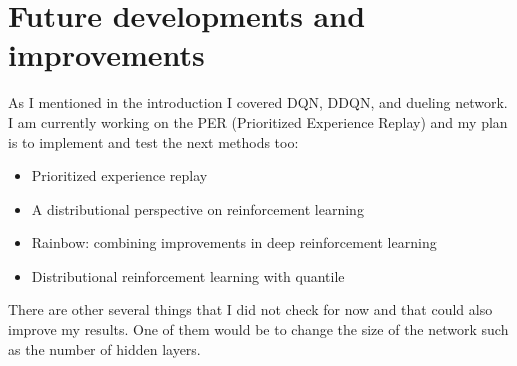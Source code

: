\documentclass[12pt]{article}
\begin{document}
\section{Future developments and improvements}
As I mentioned in the introduction I covered DQN, DDQN, and dueling network. I am currently working on the PER (Prioritized Experience Replay) and my plan is to implement and test the next methods too:

\begin{itemize}
\item Prioritized experience replay
\item A distributional perspective on reinforcement learning
\item Rainbow: combining improvements in deep reinforcement learning 
\item Distributional reinforcement learning with quantile 
\end{itemize}

There are other several things that I did not check for now and that could also improve my results. One of them would be to change the size of the network such as the number of hidden layers.

{}

\end{document}
